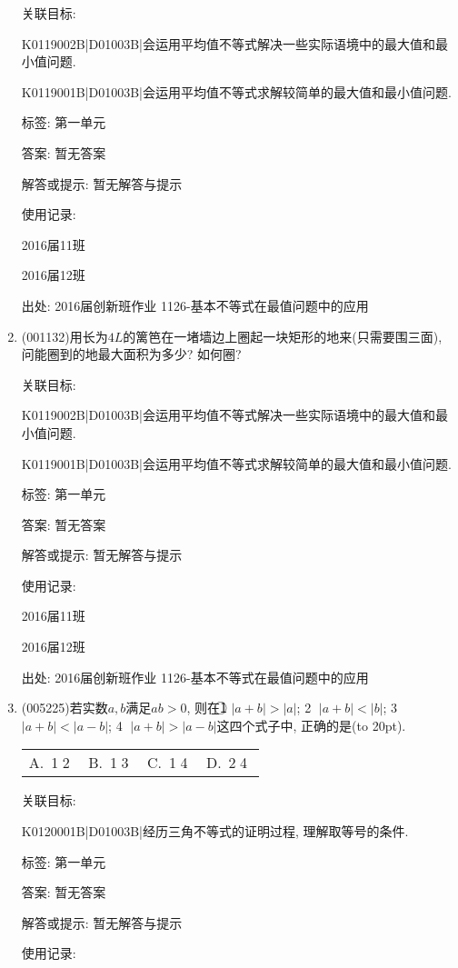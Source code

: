 \documentclass[10pt,a4paper]{article}
\newcommand{\bracket}[1]{(\hbox to #1pt{})}
\newcommand{\fourch}[4]{\par\begin{tabular}{p{.23\textwidth}p{.23\textwidth}p{.23\textwidth}p{.23\textwidth}}
A.~#1 &B.~#2& C.~#3& D.~#4
\end{tabular}}
\begin{document}
\begin{enumerate}[1.]
关联目标:

K0119002B|D01003B|会运用平均值不等式解决一些实际语境中的最大值和最小值问题.

K0119001B|D01003B|会运用平均值不等式求解较简单的最大值和最小值问题.



标签: 第一单元

答案: 暂无答案

解答或提示: 暂无解答与提示

使用记录:

2016届11班	

2016届12班	


出处: 2016届创新班作业	1126-基本不等式在最值问题中的应用
\item { (001132)}用长为$4L$的篱笆在一堵墙边上圈起一块矩形的地来(只需要围三面), 问能圈到的地最大面积为多少? 如何圈?


关联目标:

K0119002B|D01003B|会运用平均值不等式解决一些实际语境中的最大值和最小值问题.

K0119001B|D01003B|会运用平均值不等式求解较简单的最大值和最小值问题.



标签: 第一单元

答案: 暂无答案

解答或提示: 暂无解答与提示

使用记录:

2016届11班	

2016届12班	


出处: 2016届创新班作业	1126-基本不等式在最值问题中的应用
\item { (005225)}若实数$a,b$满足$ab>0$, 则在\textcircled{1} $|a+b|>|a|$; \textcircled{2} $|a+b|<|b|$; \textcircled{3} $|a+b|<|a-b|$; \textcircled{4} $|a+b|>|a-b|$这四个式子中, 正确的是\bracket{20}.
\fourch{\textcircled{1}\textcircled{2}}{\textcircled{1}\textcircled{3}}{\textcircled{1}\textcircled{4}}{\textcircled{2}\textcircled{4}}


关联目标:

K0120001B|D01003B|经历三角不等式的证明过程, 理解取等号的条件.



标签: 第一单元

答案: 暂无答案

解答或提示: 暂无解答与提示

使用记录:


\end{enumerate}
\end{document}
